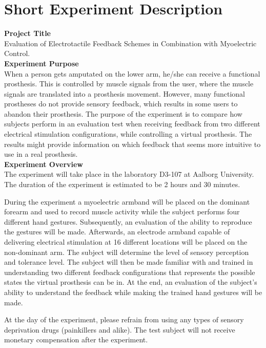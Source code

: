 \section{Short Experiment Description} \label{SED}

\noindent\textbf{Project Title} \\
Evaluation of Electrotactile Feedback Schemes in
Combination with Myoelectric Control.
\\

\noindent\textbf{Experiment Purpose} \\
When a person gets amputated on the lower arm, he/she can receive a functional prosthesis. This is controlled by muscle signals from the user, where the muscle signals are translated into a prosthesis movement. However, many functional prostheses do not provide sensory feedback, which results in some users to abandon their prosthesis. The purpose of the experiment is to compare how subjects perform in an evaluation test when receiving feedback from two different electrical stimulation configurations, while controlling a virtual prosthesis. The results might provide information on which feedback that seems more intuitive to use in a real prosthesis.  
\\ 

\noindent\textbf{Experiment Overview} \\
The experiment will take place in the laboratory D3-107 at Aalborg University. The duration of the experiment is estimated to be 2 hours and 30 minutes. 

During the experiment a myoelectric armband will be placed on the dominant forearm and used to record muscle activity while the subject performs four different hand gestures. Subsequently, an evaluation of the ability to reproduce the gestures will be made. Afterwards, an electrode armband capable of delivering electrical stimulation at 16 different locations will be placed on the non-dominant arm. The subject will determine the level of sensory perception and tolerance level. The subject will then be made familiar with and trained in understanding two different feedback configurations that represents the possible states the virtual prosthesis can be in. At the end, an evaluation of the subject’s ability to understand the feedback while making the trained hand gestures will be made. 

At the day of the experiment, please refrain from using any types of sensory deprivation drugs (painkillers and alike). The test subject will not receive monetary compensation after the experiment. 
